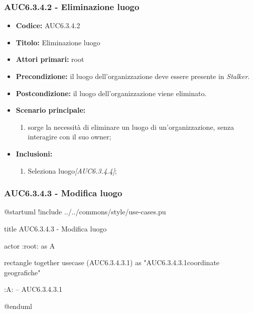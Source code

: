 \documentclass[casi-duso]{subfiles}
\begin{document}
\subsubsection{AUC6.3.4.2 - Eliminazione luogo}%
\label{subsub:AUC6.3.4.2}
\begin{itemize}
  \item \textbf{Codice:} AUC6.3.4.2
  \item \textbf{Titolo:} Eliminazione luogo
  \item \textbf{Attori primari:} root
  \item \textbf{Precondizione:} il luogo dell'organizzazione deve essere presente in \emph{Stalker}.
  \item \textbf{Postcondizione:} il luogo dell'organizzazione viene eliminato.
  \item \textbf{Scenario principale:}
  \begin{enumerate}
    \item sorge la necessità di eliminare un luogo di un'organizzazione, senza interagire con il suo owner;
  \end{enumerate}
  \item \textbf{Inclusioni:}
  \begin{enumerate}
    \item Seleziona luogo\emph{[AUC6.3.4.4]};
  \end{enumerate}
\end{itemize}

\subsubsection{AUC6.3.4.3 - Modifica luogo}%
\label{subsub:AUC6.3.4.3}

\begin{plantuml}
@startuml 
!include ../../commons/style/use-cases.pu

title AUC6.3.4.3 - Modifica luogo

actor :root: as A

rectangle {
  together {
    usecase (AUC6.3.4.3.1) as "AUC6.3.4.3.1\nModifica coordinate geografiche"
  }
}

:A: -- AUC6.3.4.3.1

@enduml
\end{plantuml}
\end{document}
